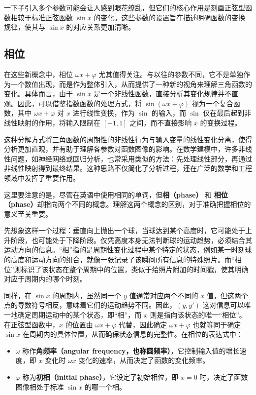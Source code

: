 一下子引入多个参数可能会让人感到眼花缭乱，但它们的核心作用是刻画正弦型函数相较于标准正弦函数 $\sin x$ 的变化。这些参数的设置旨在描述明确函数的变换规律，使其与 $\sin x$ 的对应关系更加清晰。

\subsection{相位}

在这些新概念中，相位 $\omega x + \varphi$ 尤其值得关注。与以往的参数不同，它不是单独作为一个数值出现，而是作为整体引入，从而提供了一种新的视角来理解三角函数的变化。具体而言，由于 $\sin x$ 是一个非线性函数，直接分析其变化规律并不直观。因此，可以借鉴指数函数的处理方式，将 $\sin(\omega x + \varphi)$ 视为一个复合函数，其中 $\omega x + \varphi$ 对 $x$ 进行线性变换，作为 $\sin$ 的输入，而 $\sin$ 仅在最后起到非线性映射的作用，将输入限制在 $[-1,1]$ 之间，而不直接影响 $x$ 的变换过程。

这种分解方式将三角函数的周期性的非线性行为与输入变量的线性变化分离，使得分析更加直观，并有助于理解各参数对函数图像的影响。在数学建模中，许多非线性问题，如神经网络或回归分析，也常采用类似的方法：先处理线性部分，再通过非线性映射得到最终结果。这种思路不仅简化了分析过程，还在广泛的数学和工程领域中发挥了重要作用。

这里要注意的是，尽管在英语中使用相同的单词，但\textbf{相（phase）} 和 \textbf{相位（phase）}却指向两个不同的概念。理解这两个概念的区别，对于准确把握相位的意义至关重要。

先想象这样一个过程：垂直向上抛出一个球，当球达到某个高度时，它可能处于上升阶段，也可能处于下降阶段。仅凭高度本身无法判断球的运动趋势，必须结合其运动方向的信息。“相”指的是周期性变化过程中某个特定的状态，例如某一时刻球的高度和运动方向的组合，就像一张记录了该瞬间所有信息的特殊照片。而“相位”则标识了该状态在整个周期中的位置，类似于给照片附加的时间戳，使其明确对应于周期内的哪个时刻。

同样，在 $\sin x$ 的周期内，虽然同一个 $y$ 值通常对应两个不同的 $x$ 值，但这两个点的导数符号相反，意味着它们的运动趋势不同。因此，$(y, y')$ 这对信息可以唯一地确定周期运动中的某个状态，即“相”，而 $x$ 则是指向该状态的唯一“相位”。在正弦型函数中，$x$ 的位置由 $\omega x + \varphi$ 代替，因此确定 $\omega x + \varphi$ 也就等同于确定 $\sin x$ 在周期内的具体位置，从而确保状态信息的完整性。在相位的表达式中：
\begin{itemize}
\item $\omega$ 称作\textbf{角频率（angular frequency，也称圆频率）}，它控制输入值的增长速度，即 $x$ 变化时 $\omega x$ 变化的速率，从而决定了函数的变化频率。
\item $\varphi$ 称为\textbf{初相（initial phase）}，它设定了初始相位，即 $x=0$ 时，决定了函数图像相处于标准 $\sin x$ 的哪一个相。
\end{itemize}

